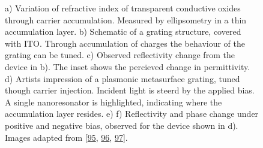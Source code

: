 \documentclass[a4paper,10pt,english,openany,oneside]{jupyterBook}
\begin{document}
\begin{figure}[htbp]
\centering
\capstart

\noindent{}
\caption{a) Variation of refractive index of transparent conductive oxides through carrier accumulation. Measured by ellipsometry in a thin accumulation layer. b) Schematic of a grating structure, covered with ITO. Through accumulation of charges the behaviour of the grating can be tuned. c) Observed reflectivity change from the device in b). The inset shows the percieved change in permittivity. d) Artists impression of a plasmonic metasurface grating, tuned though carrier injection. Incident light is steerd by the applied bias. A single nano\sphinxhyphen{}resonator is highlighted, indicating where the accumulation layer resides. e) \sphinxhyphen{} f) Reflectivity and phase change under positive and negative bias, observed for the device shown in d). Images adapted from {[}\hyperlink{cite.bib:id472}{95}, \hyperlink{cite.bib:id71}{96}, \hyperlink{cite.bib:id84}{97}{]}.}\label{\detokenize{sota:chapter2-image15}}\end{figure}
\end{document}
